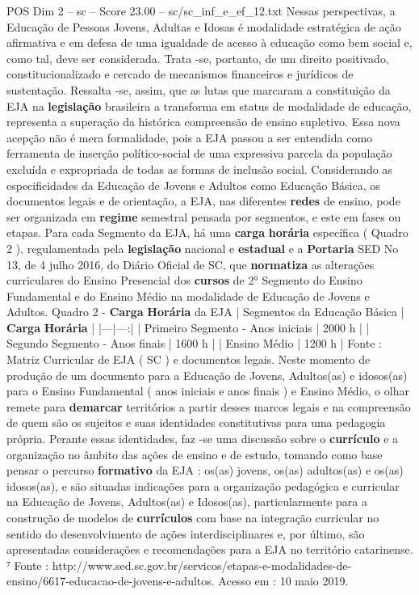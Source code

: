 \begin{textsample}{POS Dim 2 – sc – Score 23.00 – sc/sc\_inf\_e\_ef\_12.txt}
Nessas perspectivas, a Educação de Pessoas Jovens, Adultas e Idosas é modalidade estratégica de ação afirmativa e em defesa de uma igualdade de acesso à educação como bem social e, como tal, deve ser considerada.
Trata -se, portanto, de um direito positivado, constitucionalizado e cercado de mecanismos financeiros e jurídicos de sustentação.
Ressalta -se, assim, que as lutas que marcaram a constituição da EJA na \textbf{legislação} brasileira a transforma em status de modalidade de educação, representa a superação da histórica compreensão de ensino supletivo.
Essa nova acepção não é mera formalidade, pois a EJA passou a ser entendida como ferramenta de inserção político-social de uma expressiva parcela da população excluída e expropriada de todas as formas de inclusão social.
Considerando as especificidades da Educação de Jovens e Adultos como Educação Básica, os documentos legais e de orientação, a EJA, nas diferentes \textbf{redes} de ensino, pode ser organizada em \textbf{regime} semestral pensada por segmentos, e este em fases ou etapas.
Para cada Segmento da EJA, há uma \textbf{carga} \textbf{horária} específica ( Quadro 2 ), regulamentada pela \textbf{legislação} nacional e \textbf{estadual} e a \textbf{Portaria} SED No 13, de 4 julho 2016, do Diário Oficial de SC, que \textbf{normatiza} as alterações curriculares do Ensino Presencial dos \textbf{cursos} de 2{\EmojiFont °} Segmento do Ensino Fundamental e do Ensino Médio na modalidade de Educação de Jovens e Adultos.
Quadro 2 - \textbf{Carga} \textbf{Horária} da EJA | Segmentos da Educação Básica | \textbf{Carga} \textbf{Horária} | |---|---:| | Primeiro Segmento - Anos iniciais | 2000 h | | Segundo Segmento - Anos finais | 1600 h | | Ensino Médio | 1200 h | Fonte : Matriz Curricular de EJA ( SC ) e documentos legais.
Neste momento de produção de um documento para a Educação de Jovens, Adultos(as) e idosos(as) para o Ensino Fundamental ( anos iniciais e anos finais ) e Ensino Médio, o olhar remete para \textbf{demarcar} territórios a partir desses marcos legais e na compreensão de quem são os sujeitos e suas identidades constitutivas para uma pedagogia própria.
Perante essas identidades, faz -se uma discussão sobre o \textbf{currículo} e a organização no âmbito das ações de ensino e de estudo, tomando como base pensar o percurso \textbf{formativo} da EJA : os(as) jovens, os(as) adultos(as) e os(as) idosos(as), e são situadas indicações para a organização pedagógica e curricular na Educação de Jovens, Adultos(as) e Idosos(as), particularmente para a construção de modelos de \textbf{currículos} com base na integração curricular no sentido do desenvolvimento de ações interdisciplinares e, por último, são apresentadas considerações e recomendações para a EJA no território catarinense. ⁷ Fonte : http://www.sed.sc.gov.br/servicos/etapas-e-modalidades-de-ensino/6617-educacao-de-jovens-e-adultos.
Acesso em : 10 maio 2019.

\end{textsample}
